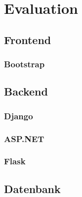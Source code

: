 \section{Evaluation}
\subsection{Frontend}
\subsubsection{Bootstrap}


\subsection{Backend}
\subsubsection{Django}


\subsubsection{ASP.NET}
\subsubsection{Flask}


\subsection{Datenbank}


\newpage